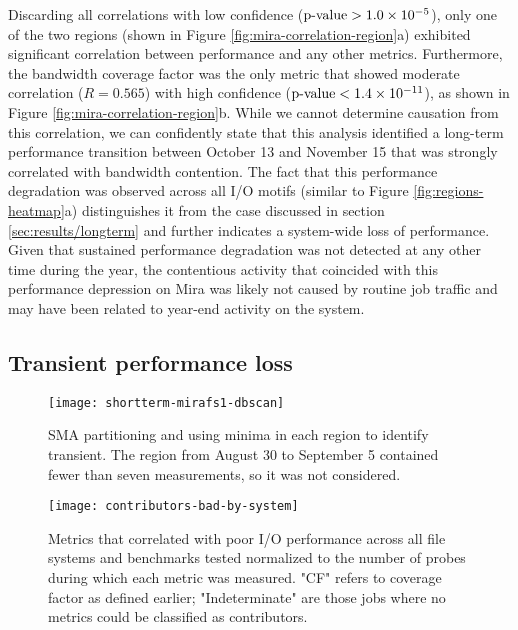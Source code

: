 Discarding all correlations with low confidence ($\textup{p-value} > {1.0 \times 10^{-5}}$), only {\color{red}one of the two regions} (shown in Figure \ref{fig:mira-correlation-region}a) exhibited significant correlation between performance and any other metrics.
Furthermore, the bandwidth coverage factor was the only metric that showed moderate correlation (${R = 0.565}$) with high confidence ($\textup{p-value} < 1.4 \times 10^{-11}$), as shown in Figure \ref{fig:mira-correlation-region}b.
While we cannot determine causation from this correlation, we can confidently state that this analysis identified a long-term performance transition between October 13 and November 15 that was strongly correlated with bandwidth contention.
The fact that this performance degradation was observed across all I/O motifs (similar to Figure \ref{fig:regions-heatmap}a) distinguishes it from the case discussed in section \ref{sec:results/longterm} and further indicates a system-wide loss of performance.
Given that sustained performance degradation was not detected at any other time during the year, the contentious activity that coincided with this performance depression on Mira was likely not caused by routine job traffic and may have been related to year-end activity on the system.







\subsection{Transient performance loss} \label{sec:results/shortterm}

\begin{figure}
    \centering
    \texttt{[image: shortterm-mirafs1-dbscan]}
    \vspace{-.35in}
    \caption{SMA partitioning and using minima in each region to identify transient.  The region from August 30 to September 5 contained fewer than seven measurements, so it was not considered.}
    \label{fig:shortterm-mirafs1-dbscan}
\end{figure}

\begin{figure}
    \centering
    \texttt{[image: contributors-bad-by-system]}
    \vspace{-.35in}
    \caption{Metrics that correlated with poor I/O performance across all file systems and benchmarks tested normalized to the number of probes during which each metric was measured.
    "CF" refers to coverage factor as defined earlier;
    "Indeterminate" are those jobs where no metrics could be classified as contributors.
    }
    \label{fig:contributors-bad-by-system}
\end{figure}


